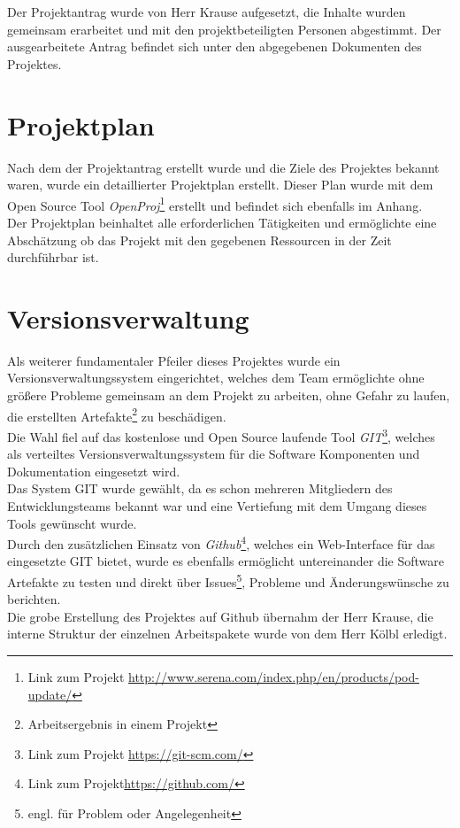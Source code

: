 Der Projektantrag wurde von Herr Krause aufgesetzt, die Inhalte wurden gemeinsam erarbeitet und mit den projektbeteiligten Personen abgestimmt. Der ausgearbeitete Antrag befindet sich unter den abgegebenen Dokumenten des Projektes.

\section{Projektplan}
Nach dem der Projektantrag erstellt wurde und die Ziele des Projektes bekannt waren, wurde ein detaillierter Projektplan erstellt. Dieser Plan wurde mit dem Open Source Tool \textit{OpenProj}\footnote{Link zum Projekt  \url{http://www.serena.com/index.php/en/products/pod-update/}} erstellt und befindet sich ebenfalls im Anhang.\\
Der Projektplan beinhaltet alle erforderlichen Tätigkeiten und ermöglichte eine Abschätzung ob das Projekt mit den gegebenen Ressourcen in der Zeit durchführbar ist.

\section{Versionsverwaltung}
Als weiterer fundamentaler Pfeiler dieses Projektes wurde ein Versionsverwaltungssystem eingerichtet, welches dem Team ermöglichte ohne größere Probleme gemeinsam an dem Projekt zu arbeiten, ohne Gefahr zu laufen, die erstellten Artefakte\footnote{Arbeitsergebnis in einem Projekt} zu beschädigen.\\
Die Wahl fiel auf das kostenlose und Open Source laufende Tool \textit{GIT}\footnote{Link zum Projekt \url{https://git-scm.com/}}, welches als verteiltes Versionsverwaltungssystem für die Software Komponenten und Dokumentation eingesetzt wird.\\
Das System GIT wurde gewählt, da es schon mehreren Mitgliedern des Entwicklungsteams bekannt war und eine Vertiefung mit dem Umgang dieses Tools gewünscht wurde.\\
Durch den zusätzlichen Einsatz von \textit{Github}\footnote{Link zum Projekt\url{https://github.com/}}, welches ein Web-Interface für das eingesetzte GIT bietet, wurde es ebenfalls ermöglicht untereinander die Software Artefakte zu testen und direkt über Issues\footnote{engl. für Problem oder Angelegenheit}, Probleme und Änderungswünsche zu berichten.\\
Die grobe Erstellung des Projektes auf Github übernahm der Herr Krause, die interne Struktur der einzelnen Arbeitspakete wurde von dem Herr Kölbl erledigt. 


